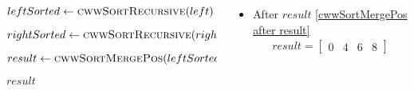 \begin{frame}[containsverbatim]{\cwwalgortihmexampleframe}
\begin{columns}[c]
\begin{column}{0.4\textwidth}
{\begin{minipage}[c]{\textwidth}
\begin{algorithm}[H]
\begin{algorithmic}[1]
                                            \label{cwwSortRecursive before leftsorted}
                                            \State $leftSorted \gets \Call{cwwSortRecursive}{left}$
                                            \label{cwwSortRecursive after leftsorted}
                                            
                                            \label{cwwSortRecursive before rightsorted}
                                            \State $rightSorted \gets \Call{cwwSortRecursive}{right}$
                                            \label{cwwSortRecursive after rightsorted}

                                            \label{cwwSortRecursive before result}
                                            \State $result \gets \Call{cwwSortMergePos}{leftSorted, rightSorted}$
                                            \label{cwwSortRecursive after result}
                
                                            \State \Return $result$
                                        \EndFunction
                                    \end{algorithmic}
                                \end{algorithm}
                            \endgroup
                        \end{minipage}
                    }
                \end{column}

                \begin{column}{0.6\textwidth}
                    \vspace{-0.4cm}
                        \begin{itemize}
                            \item After $result$ \cref{cwwSortMergePos after result}
                            \begin{align*}
                                result = \begin{bmatrix}0 & 4 & 6 & 8\end{bmatrix}
                            \end{align*}
                        \end{itemize}
                \end{column}
            \end{columns}
        \end{frame}


